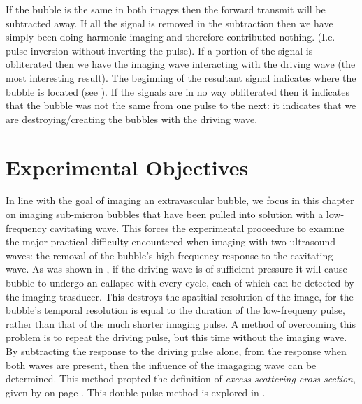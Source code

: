 If the bubble is the same in both images then the forward transmit will be subtracted away.
If all the signal is removed in the subtraction then we have simply been doing harmonic imaging and therefore contributed nothing.
(I.e. pulse inversion without inverting the pulse).
If a portion of the signal is obliterated then we have the imaging wave interacting with the driving wave (the most interesting result).
The beginning of the resultant signal indicates where the bubble is located (see ).
If the signals are in no way obliterated then it indicates that the bubble was not the same from one pulse to the next:
it indicates that we are destroying/creating the bubbles with the driving wave.





\section{Experimental Objectives} \label{sec:WE:objectives}



In line with the goal of imaging an extravascular bubble,
we focus in this chapter on imaging sub-micron bubbles 
that have been pulled into solution with a low-frequency cavitating wave.
This forces the experimental proceedure to 
examine the major practical difficulty encountered when imaging with two ultrasound waves:
the removal of the  bubble's high frequency response to the cavitating wave.
As was shown in ,
if the driving wave is of sufficient pressure 
it will cause bubble to undergo an callapse with every cycle,
each of which  can be detected by the imaging trasducer.
This destroys the spatitial resolution of the image,
for the bubble's temporal resolution is equal to the  duration of the low-frequeny pulse,
rather than that of the much shorter imaging pulse.
A method of overcoming this problem is to repeat the driving pulse,
but this time without the imaging wave.
By subtracting the response to the driving pulse alone,
from the response when both waves are present,
then the influence of the imagaging wave can be determined.
This method propted the definition of {\em excess scattering cross section},
given by  on page \pageref{eqn:excessI}.
This double-pulse method is explored in .



